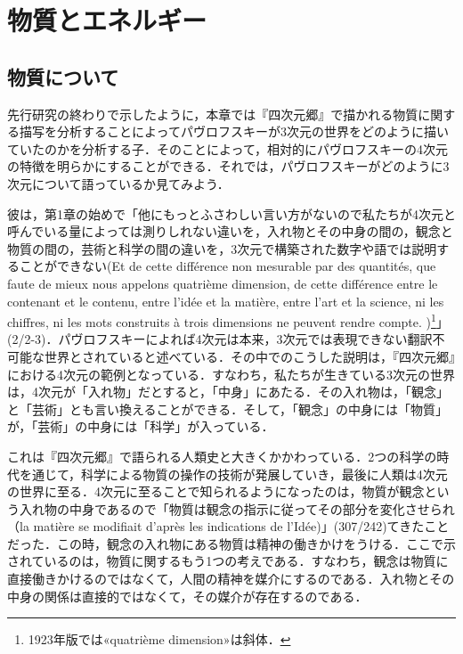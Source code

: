 \chapter{物質とエネルギー}
\section{物質について}

先行研究の終わりで示したように，本章では『四次元郷』で描かれる物質に関する描写を分析することによってパヴロフスキーが3次元の世界をどのように描いていたのかを分析する子．そのことによって，相対的にパヴロフスキーの4次元の特徴を明らかにすることができる．それでは，パヴロフスキーがどのように3次元について語っているか見てみよう．

彼は，第1章の始めで「他にもっとふさわしい言い方がないので私たちが4次元と呼んでいる量によっては測りしれない違いを，入れ物とその中身の間の，観念と物質の間の，芸術と科学の間の違いを，3次元で構築された数字や語では説明することができない(Et de cette différence non mesurable par des quantités, que faute de mieux nous appelons quatrième dimension, de cette différence entre le contenant et le contenu, entre l'idée et la matière, entre l'art et la science, ni les chiffres, ni les mots construits à trois dimensions ne peuvent rendre compte. )\footnote{1923年版では«quatrième dimension»は斜体．}」(2/2-3)．パヴロフスキーによれば4次元は本来，3次元では表現できない翻訳不可能な世界とされていると述べている．その中でのこうした説明は，『四次元郷』における4次元の範例となっている．すなわち，私たちが生きている3次元の世界は，4次元が「入れ物」だとすると，「中身」にあたる．その入れ物は，「観念」と「芸術」とも言い換えることができる．そして，「観念」の中身には「物質」が，「芸術」の中身には「科学」が入っている．

これは『四次元郷』で語られる人類史と大きくかかわっている．2つの科学の時代を通じて，科学による物質の操作の技術が発展していき，最後に人類は4次元の世界に至る．4次元に至ることで知られるようになったのは，物質が観念という入れ物の中身であるので「物質は観念の指示に従ってその部分を変化させられ（la matière se modifiait d'après les indications de l'Idée)」(307/242)てきたことだった．この時，観念の入れ物にある物質は精神の働きかけをうける．ここで示されているのは，物質に関するもう1つの考えである．すなわち，観念は物質に直接働きかけるのではなくて，人間の精神を媒介にするのである．入れ物とその中身の関係は直接的ではなくて，その媒介が存在するのである．

